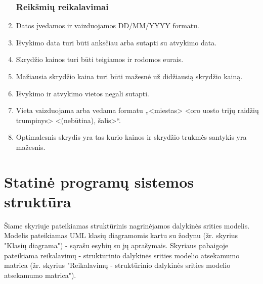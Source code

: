 \documentclass{VUMIFPSkursinis}
\begin{document}
\begin{enumerate}[label=\textbf{NFR\arabic*}.]
					\subsubsection{Reikšmių reikalavimai}
                    	\item Datos įvedamos ir vaizduojamos DD/MM/YYYY formatu.
                    	\item Išvykimo data turi būti anksčiau arba sutapti su atvykimo data.
                    	\item Skrydžio kainos turi būti teigiamos ir rodomos eurais.
                    	\item Mažiausia skrydžio kaina turi būti mažesnė už didžiausią skrydžio kainą.
                    	\item Išvykimo ir atvykimo vietos negali sutapti.
                    	\item Vieta vaizduojama arba vedama formatu „<miestas> <oro uosto trijų raidžių trumpinys> <(nebūtina), šalis>“.
                    	\item \label{optimalus} Optimalesnis skrydis yra tas kurio kainos ir skrydžio trukmės santykis yra mažesnis.
                \end{enumerate}
      
        \section{Statinė programų sistemos struktūra}
            Šiame skyriuje pateikiamas struktūrinis nagrinėjamos dalykinės srities modelis. Modelis pateikiamas UML klasių diagramomis kartu su žodynu (žr. skyrius "Klasių diagrama") - sąrašu esybių su jų aprašymais. Skyriaus pabaigoje pateikiama reikalavimų - struktūrinio dalykinės srities modelio atsekamumo matrica (žr. skyrius "Reikalavimų - struktūrinio dalykinės srities modelio atsekamumo matrica").
\end{document}
